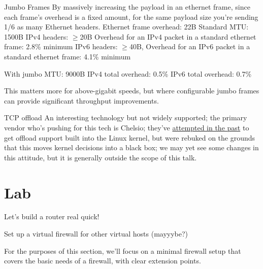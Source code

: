 \documentclass[bigger]{beamer}
\begin{document}
\begin{frame}{Jumbo Frames}
  By massively increasing the payload in an ethernet frame, since each frame's overhead is a fixed amount, for the same
  payload size you're sending 1/6 as many Ethernet headers.
  Ethernet frame overhead: 22B
  Standard MTU: 1500B
  IPv4 headers: $\geq$20B
  Overhead for an IPv4 packet in a standard ethernet frame: 2.8\% minimum
  IPv6 headers: $\geq$40B,
  Overhead for an IPv6 packet in a standard ethernet frame: 4.1\% minimum

  With jumbo MTU: 9000B
  IPv4 total overhead: 0.5\%
  IPv6 total overhead: 0.7\%

  This matters more for above-gigabit speeds, but where configurable jumbo frames can provide significant throughput improvements.

\end{frame}

\begin{frame}[label={sec:orgc8262cc}]{TCP offload}
An interesting technology but not widely supported; the primary vendor who's
pushing for this tech is Chelsio; they've \href{https://lwn.net/Articles/148697/}{attempted in the past} to get offload
support built into the Linux kernel, but were rebuked on the grounds that this
moves kernel decisions into a black box; we may yet see some changes in this
attitude, but it is generally outside the scope of this talk.
\end{frame}

\section{Lab}
\label{sec:org475924a}

Let's build a router real quick!

Set up a virtual firewall for other virtual hosts (mayyybe?)

For the purposes of this section, we'll focus on a minimal firewall setup that
covers the basic needs of a firewall, with clear extension points.
\end{document}
